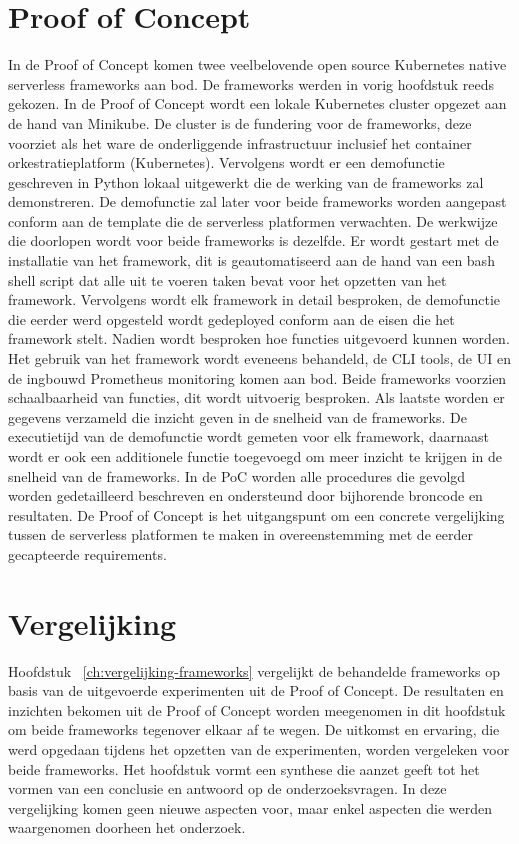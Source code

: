 \section{Proof of Concept}
In de Proof of Concept komen twee veelbelovende open source Kubernetes native serverless frameworks aan bod. De frameworks werden in vorig hoofdstuk reeds gekozen. In de Proof of Concept wordt een lokale Kubernetes cluster opgezet aan de hand van Minikube. De cluster is de fundering voor de frameworks, deze voorziet als het ware de onderliggende infrastructuur inclusief het container orkestratieplatform (Kubernetes). Vervolgens wordt er een demofunctie geschreven in Python lokaal uitgewerkt die de werking van de frameworks zal demonstreren. De demofunctie zal later voor beide frameworks worden aangepast conform aan de template die de serverless platformen verwachten. De werkwijze die doorlopen wordt voor beide frameworks is dezelfde. Er wordt gestart met de installatie van het framework, dit is geautomatiseerd aan de hand van een bash shell script dat alle uit te voeren taken bevat voor het opzetten van het framework. Vervolgens wordt elk framework in detail besproken, de demofunctie die eerder werd opgesteld wordt gedeployed conform aan de eisen die het framework stelt. Nadien wordt besproken hoe functies uitgevoerd kunnen worden. Het gebruik van het framework wordt eveneens behandeld, de CLI tools, de UI en de ingbouwd Prometheus monitoring komen aan bod. Beide frameworks voorzien schaalbaarheid van functies, dit wordt uitvoerig besproken. Als laatste worden er gegevens verzameld die inzicht geven in de snelheid van de frameworks. De executietijd van de demofunctie wordt gemeten voor elk framework, daarnaast wordt er ook een additionele functie toegevoegd om meer inzicht te krijgen in de snelheid van de frameworks. In de PoC worden alle procedures die gevolgd worden gedetailleerd beschreven en ondersteund door bijhorende broncode en resultaten. De Proof of Concept is het uitgangspunt om een concrete vergelijking tussen de serverless platformen te maken in overeenstemming met de eerder gecapteerde requirements.

\section{Vergelijking}
Hoofdstuk ~\ref{ch:vergelijking-frameworks} vergelijkt de behandelde frameworks op basis van de uitgevoerde experimenten uit de Proof of Concept. De resultaten en inzichten bekomen uit de Proof of Concept worden meegenomen in dit hoofdstuk om beide frameworks tegenover elkaar af te wegen. De uitkomst en ervaring, die werd opgedaan tijdens het opzetten van de experimenten, worden vergeleken voor beide frameworks. Het hoofdstuk vormt een synthese die aanzet geeft tot het vormen van een conclusie en antwoord op de onderzoeksvragen. In deze vergelijking komen geen nieuwe aspecten voor, maar enkel aspecten die werden waargenomen doorheen het onderzoek.